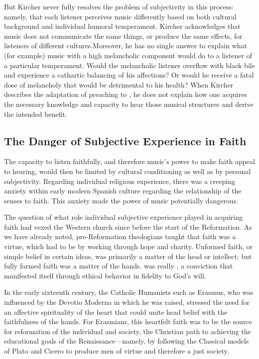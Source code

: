 But Kircher never fully resolves the problem of subjectivity in this process: namely, that each listener perceives music differently based on both cultural background and individual humoral temperament.
Kircher acknowledges that music does not communicate the same things, or produce the same effects, for listeners of different cultures.
Moreover, he has no single answer to explain what (for example) music with a high melancholic component would do to a listener of a particular temperament.
Would the melancholic listener overflow with black bile and experience a cathartic balancing of his affections?
Or would he receive a fatal dose of melancholy that would be detrimental to his health?
When Kircher describes the  adaptation of preaching to , he does not explain how one acquires the necessary knowledge and capacity to hear those musical structures and derive the intended benefit.

\subsection{The Danger of Subjective Experience in Faith}

The capacity to listen faithfully, and therefore music's power to make faith appeal to hearing, would then be limited by cultural conditioning as well as by personal subjectivity.
Regarding individual religious experience, there was a creeping anxiety within early modern Spanish culture regarding the relationship of the senses to faith.
This anxiety made the power of music potentially dangerous.

The question of what role individual subjective experience played in acquiring faith had vexed the Western church since before the start of the Reformation.
As we have already noted, pre-Reformation theologians taught that faith was a virtue, which had to be  by working through hope and charity.
Unformed faith, or simple belief in certain ideas, was primarily a matter of the head or intellect; but fully formed faith was a matter of the hands.
 was really , a conviction that manifested itself through ethical behavior in fidelity to God's will.

In the early sixteenth century, the Catholic Humanists such as Erasmus, who was influenced by the Devotio Moderna in which he was raised, stressed the need for an affective spirituality of the heart that could unite head belief with the faithfulness of the hands.\citXXX{}
For Erasmians, this heartfelt faith was to be the source for reformation of the individual and society, the Christian path to achieving the educational goals of the Renaissance---namely, by following the Classical models of Plato and Cicero to produce men of virtue and therefore a just society.

